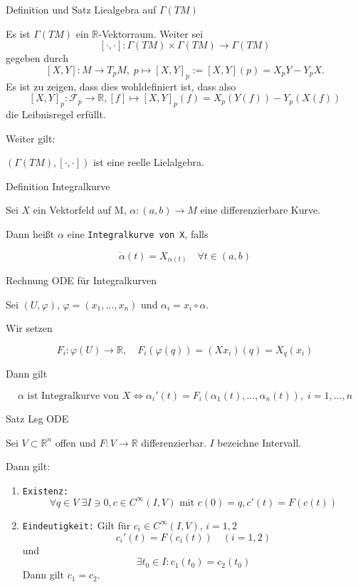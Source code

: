 \documentclass[a6paper,11pt,grid=front]{kartei}
\newcommand{\fl}[1]{\begin{flushleft}
 #1 \end{flushleft}}
\newcommand{\R}{\mathbb{R}}
\newcounter{def}
\begin{document}
\nonameyet
{Definition und Satz} {Liealgebra auf $\Gamma(TM)$}
{
\small
Es ist $\Gamma(TM)$ ein $\R$-Vektorraum. 
Weiter sei
\[
[\cdot,\cdot]: \Gamma(TM)\times \Gamma(TM) \to \Gamma(TM)
\]
gegeben durch 
\[
[X,Y] : M \to T_pM, \; p \mapsto [X,Y]_p := [X,Y](p) = X_pY - Y_pX.
\]
Es ist zu zeigen, dass dies wohldefiniert ist, dass also
\[
[X,Y]_p : \mathcal{F}_p \to \R, [f] \mapsto [X,Y]_p(f) = X_p(Y(f)) - Y_p(X(f))
\]
die Leibnisregel erfüllt.

\fl{Weiter gilt:}

$(\Gamma(TM),[\cdot,\cdot])$ ist eine reelle Lielalgebra.
}
{}

\nonameyet
{Definition} {Integralkurve}
{
Sei $X$ ein Vektorfeld auf M, $\alpha: (a,b) \to M$ eine differenzierbare
Kurve.
\\
\fl{Dann heißt $\alpha$ eine \texttt{Integralkurve von X}, falls} 
\[
\dot \alpha (t) = X_{\alpha(t)} \quad \forall t \in (a,b)
\]
}
{}

\nonameyet
{Rechnung} {ODE für Integralkurven}
{
Sei $(U,\varphi)$, $\varphi = (x_1,\dots,x_n)$ und 
$\alpha_i = x_i \circ \alpha$.
\\
\fl{Wir setzen} 
$$F_i: \varphi(U) \to \R, \quad F_i(\varphi(q)) = (Xx_i)(q) = X_q(x_i)$$
\fl{Dann gilt}
\small
\[
\alpha \text{ ist Integralkurve von } X 
\Leftrightarrow
\alpha_i'(t) = F_i (\alpha_1(t),\dots,\alpha_n(t)), \; i = 1,\dots,n
\]
}
{}

\nonameyet
{Satz} {Lsg ODE}
{
	\small
Sei $V\subset \R^n$ offen und $F: V\to \R$ differenzierbar. $I$ bezeichne Intervall.
\\
\normalsize
\fl{Dann gilt:}
\begin{enumerate}[1.]
\item \texttt{Existenz:}
\vspace{-1em} 
\[
\forall q\in V \; \exists I\ni 0,  
c\in C^\infty(I,V)\text{ mit } c(0) = q, c'(t) = F(c(t))  
\]
%
\item \texttt{Eindeutigkeit:} Gilt für $c_i \in C^\infty(I,V)$, $i = 1,2$
\vspace{-0.8em}
\[
c_i'(t) = F(c_i(t)) \quad (i =1,2)
\]
und
\[
\exists t_0 \in I: c_1(t_0) = c_2(t_0)
\]
Dann gilt $c_1 = c_2$.
\end{enumerate}
}
{}
\end{document}
